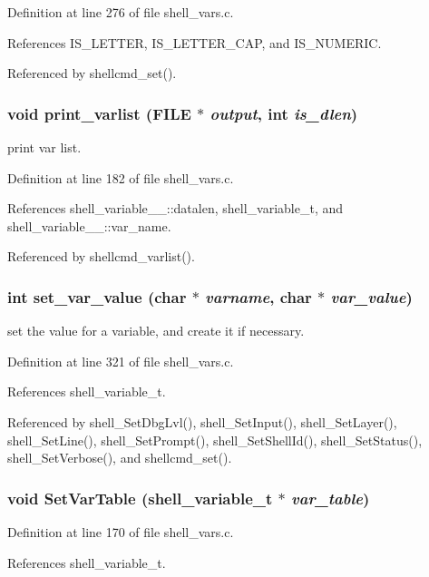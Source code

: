 Definition at line 276 of file shell\_\-vars.c.

References IS\_\-LETTER, IS\_\-LETTER\_\-CAP, and IS\_\-NUMERIC.

Referenced by shellcmd\_\-set().
\subsubsection{\setlength{\rightskip}{0pt plus 5cm}void print\_\-varlist (FILE $\ast$ {\em output}, int {\em is\_\-dlen})}\label{shell__vars_8c_a9}


print var list. 

Definition at line 182 of file shell\_\-vars.c.

References shell\_\-variable\_\-\_\-::datalen, shell\_\-variable\_\-t, and shell\_\-variable\_\-\_\-::var\_\-name.

Referenced by shellcmd\_\-varlist().
\subsubsection{\setlength{\rightskip}{0pt plus 5cm}int set\_\-var\_\-value (char $\ast$ {\em varname}, char $\ast$ {\em var\_\-value})}\label{shell__vars_8c_a16}


set the value for a variable, and create it if necessary. 

Definition at line 321 of file shell\_\-vars.c.

References shell\_\-variable\_\-t.

Referenced by shell\_\-Set\-Dbg\-Lvl(), shell\_\-Set\-Input(), shell\_\-Set\-Layer(), shell\_\-Set\-Line(), shell\_\-Set\-Prompt(), shell\_\-Set\-Shell\-Id(), shell\_\-Set\-Status(), shell\_\-Set\-Verbose(), and shellcmd\_\-set().
\subsubsection{\setlength{\rightskip}{0pt plus 5cm}void Set\-Var\-Table ({\bf shell\_\-variable\_\-t} $\ast$ {\em var\_\-table})}\label{shell__vars_8c_a8}




Definition at line 170 of file shell\_\-vars.c.

References shell\_\-variable\_\-t.